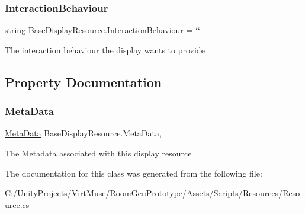 \subsubsection{\texorpdfstring{Interaction\+Behaviour}{InteractionBehaviour}}
{\footnotesize\ttfamily string Base\+Display\+Resource.\+Interaction\+Behaviour = \char`\"{}\char`\"{}}



The interaction behaviour the display wants to provide 



\subsection{Property Documentation}
\mbox{\label{class_base_display_resource_a0a9f0a877d169dd6c5c07c66ae563618}} 
\subsubsection{\texorpdfstring{Meta\+Data}{MetaData}}
{\footnotesize\ttfamily \mbox{\hyperlink{class_meta_data}{Meta\+Data}} Base\+Display\+Resource.\+Meta\+Data\hspace{0.3cm}{\ttfamily [get]}, {}}



The Metadata associated with this display resource 



The documentation for this class was generated from the following file\+:\begin{DoxyCompactItemize}
\item 
C\+:/\+Unity\+Projects/\+Virt\+Muse/\+Room\+Gen\+Prototype/\+Assets/\+Scripts/\+Resources/\mbox{\hyperlink{_resource_8cs}{Resource.\+cs}}\end{DoxyCompactItemize}
